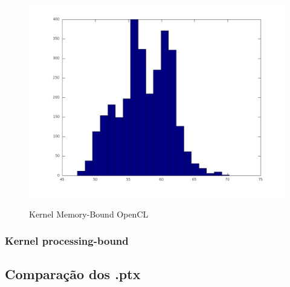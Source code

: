 \begin{figure}[H]
  \begin{center}
    \includegraphics[scale=0.3]{resultados_opencl_memory_histo.jpg}
    \label{fig:Kernel Memory-Bound OpenCL}
    \caption{Kernel Memory-Bound OpenCL}
  \end{center}
\end{figure}

\subsubsection{Kernel processing-bound}
\subsection{Comparação dos .ptx}
